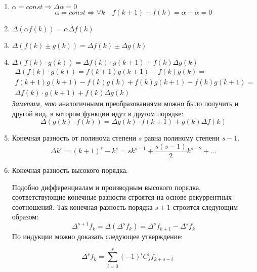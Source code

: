 \begin{enumerate}
    \item $\displaystyle \alpha = const \Rightarrow \Delta \alpha = 0$
    \begin{equation*}
        \alpha = const \Rightarrow \forall k \quad f(k+1) - f(k) = \alpha - \alpha = 0
    \end{equation*}
    \item $\displaystyle \Delta \left( \alpha f(k) \right) = \alpha \Delta f(k)$
    \item $\displaystyle \Delta \left( f(k) \pm g(k) \right) = \Delta f(k) \pm \Delta g(k)$
    \item $\displaystyle \Delta \left( f(k) \cdot g(k) \right) = \Delta f(k) \cdot g(k + 1) + f(k) \Delta g(k)$
    \begin{gather*}
        \Delta \left( f(k) \cdot g(k) \right) = f(k + 1)g(k + 1) - f(k)g(k) =\\
        f(k+1)g(k+1) - f(k)g(k) + f(k)g(k+1) - f(k)g(k+1) = \\
        \Delta f(k) \cdot g(k+1) + f(k)\Delta g(k)
    \end{gather*}
    \emph{Заметим, что} аналогичными преобразованиями можно было получить и другой вид, в котором функции идут в другом
    порядке:
    \[
        \Delta \left(g(k) \cdot f(k) \right) = \Delta g(k) \cdot f(k + 1) + g(k) \Delta f(k)
    \]
    \item Конечная разность от полинома степени $s$ равна полиному степени $s-1$.
    \begin{equation*}
        \Delta k^s = (k+1)^s - k^s = sk^{s-1} + \frac{s(s-1)}{2}k^{s-2} + \dots
    \end{equation*}
    \item Конечная разность высокого порядка.

    Подобно дифференциалам и производным высокого порядка, соответствующие конечные разности строятся на основе
    рекуррентных соотношений. Так конечная разность порядка $s+1$ строится следующим образом:
    \begin{equation*}
        \Delta^{s+1} f_k = \Delta \left(\Delta^s f_k \right) = \Delta^s f_{k+1} - \Delta^s f_k
    \end{equation*}
    По индукции можно доказать следующее утверждение:
\end{enumerate}
\begin{theorem}
    \begin{equation}
        \Delta^s f_k = \sum_{i=0}^s (-1)^i C_s^i f_{k+s-i}
    \end{equation}
\end{theorem}

